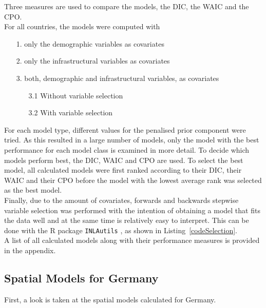 Three measures are used to compare the models, the DIC, the WAIC and the CPO. \\
For all countries, the models were computed with
\begin{itemize}
    \item[1.] only the demographic variables as covariates
    \item[2.] only the infrastructural variables as covariates
    \item[3.] both, demographic and infrastructural variables, as covariates
    \begin{itemize}
        \item[3.1] Without variable selection
        \item[3.2] With variable selection
    \end{itemize}
\end{itemize}
For each model type, different values for the penalised prior component were tried. As this resulted in a large number of models, only the model with the best performance for each model class is examined in more detail. To decide which models perform best, the DIC, WAIC and CPO are used. To select the best model, all calculated models were first ranked according to their DIC, their WAIC and their CPO before the model with the lowest average rank was selected as the best model. \\
Finally, due to the amount of covariates, forwards and backwards stepwise variable selection was performed with the intention of obtaining a model that fits the data well and at the same time is relatively easy to interpret. This can be done with the R package \texttt{INLAutils} \cite{inlautils}, as shown in Listing~\ref{codeSelection}. \\
A list of all calculated models along with their performance measures is provided in the appendix.
\subsection{Spatial Models for Germany}
First, a look is taken at the spatial models calculated for Germany. 
